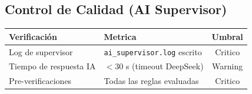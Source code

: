 \documentclass[12pt,a4paper]{article}
\begin{document}
\begin{tcolorbox}[aiSupervisor]
\subsection*{Control de Calidad (AI Supervisor)}

\begin{table}[H]
\centering
\begin{tabular}{llc}
\toprule
\textbf{Verificación} & \textbf{Metrica} & \textbf{Umbral} \\
\midrule
Log de supervisor & \texttt{ai\_supervisor.log} escrito & Critico \\
Tiempo de respuesta IA & $< 30$ s (timeout DeepSeek) & Warning \\
Pre-verificaciones & Todas las reglas evaluadas & Critico \\
\bottomrule
\end{tabular}
\end{table}

\newpage


\newpage


\newpage


\newpage


\newpage


\newpage


\newpage


\newpage

\end{tcolorbox}
\end{document}
